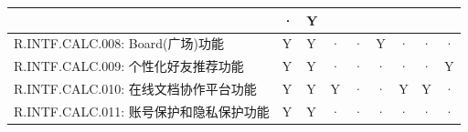 \begin{table}[htbp]
\begin{tabular}{|p{9em}|p{2.5em}|p{2.5em}|p{2.5em}|p{2.5em}|p{2.5em}|
                            p{2.5em}|p{2.5em}|p{2.5em}|}
                & ·                     & Y                 \\
            \hline %
            R.INTF.CALC.008: Board(广场)功能
                & Y                     & Y                 & · 
                & ·                     & Y                 & · 
                & ·                     & ·                 \\
            \hline %
            R.INTF.CALC.009: 个性化好友推荐功能
                & Y                     & Y                 & · 
                & ·                     & ·                 & · 
                & ·                     & Y                 \\
            \hline %
            R.INTF.CALC.010: 在线文档协作平台功能
                & Y                     & Y                 & Y 
                & ·                     & ·                 & Y 
                & Y                     & ·                 \\
            \hline %
            R.INTF.CALC.011: 账号保护和隐私保护功能
                & Y                     & Y                 & · 
                & ·                     & ·                 & · 
                & ·                     & ·                 \\
            \hline %

\end{tabular}
\end{table}
